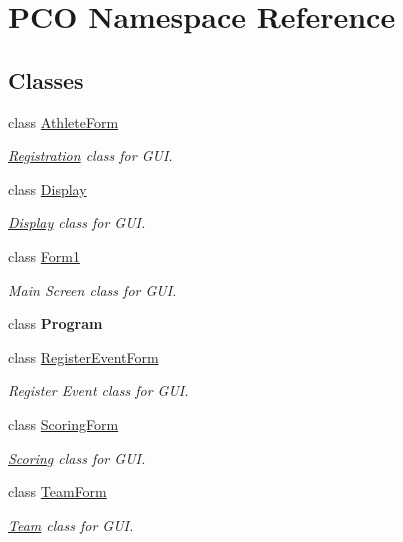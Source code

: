 \hypertarget{namespacePCO}{}\section{P\+CO Namespace Reference}
\label{namespacePCO}
\subsection*{Classes}
\begin{DoxyCompactItemize}
\item 
class \hyperlink{classPCO_1_1AthleteForm}{Athlete\+Form}
\begin{DoxyCompactList}\small\item\em \hyperlink{classRegistration}{Registration} class for G\+UI. \end{DoxyCompactList}\item 
class \hyperlink{classPCO_1_1Display}{Display}
\begin{DoxyCompactList}\small\item\em \hyperlink{classPCO_1_1Display}{Display} class for G\+UI. \end{DoxyCompactList}\item 
class \hyperlink{classPCO_1_1Form1}{Form1}
\begin{DoxyCompactList}\small\item\em Main Screen class for G\+UI. \end{DoxyCompactList}\item 
class {\bfseries Program}
\item 
class \hyperlink{classPCO_1_1RegisterEventForm}{Register\+Event\+Form}
\begin{DoxyCompactList}\small\item\em Register Event class for G\+UI. \end{DoxyCompactList}\item 
class \hyperlink{classPCO_1_1ScoringForm}{Scoring\+Form}
\begin{DoxyCompactList}\small\item\em \hyperlink{classScoring}{Scoring} class for G\+UI. \end{DoxyCompactList}\item 
class \hyperlink{classPCO_1_1TeamForm}{Team\+Form}
\begin{DoxyCompactList}\small\item\em \hyperlink{classTeam}{Team} class for G\+UI. \end{DoxyCompactList}\end{DoxyCompactItemize}

